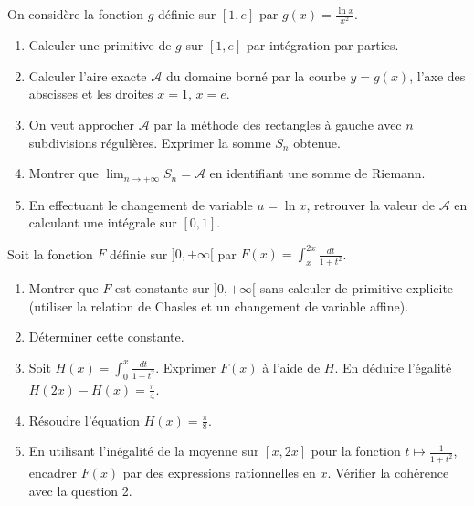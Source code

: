\documentclass[11pt]{article}
\begin{document}
\begin{exercice}
On considère la fonction $g$ définie sur $[1, e]$ par $g(x) = \frac{\ln x}{x^2}$.
\begin{enumerate}
    \item Calculer une primitive de $g$ sur $[1, e]$ par intégration par parties.
    \item Calculer l'aire exacte $\mathcal{A}$ du domaine borné par la courbe $y=g(x)$, l'axe des abscisses et les droites $x=1$, $x=e$.
    \item On veut approcher $\mathcal{A}$ par la méthode des rectangles à gauche avec $n$ subdivisions régulières. Exprimer la somme $S_n$ obtenue.
    \item Montrer que $\lim_{n \to +\infty} S_n = \mathcal{A}$ en identifiant une somme de Riemann.
    \item En effectuant le changement de variable $u = \ln x$, retrouver la valeur de $\mathcal{A}$ en calculant une intégrale sur $[0, 1]$.
\end{enumerate}
\end{exercice}

\begin{exercice}
Soit la fonction $F$ définie sur $]0, +\infty[$ par $F(x) = \int_x^{2x} \frac{dt}{1+t^2}$.
\begin{enumerate}
    \item Montrer que $F$ est constante sur $]0, +\infty[$ sans calculer de primitive explicite (utiliser la relation de Chasles et un changement de variable affine).
    \item Déterminer cette constante.
    \item Soit $H(x) = \int_0^x \frac{dt}{1+t^2}$. Exprimer $F(x)$ à l'aide de $H$. En déduire l'égalité $H(2x) - H(x) = \frac{\pi}{4}$.
    \item Résoudre l'équation $H(x) = \frac{\pi}{8}$.
    \item En utilisant l'inégalité de la moyenne sur $[x, 2x]$ pour la fonction $t \mapsto \frac{1}{1+t^2}$, encadrer $F(x)$ par des expressions rationnelles en $x$. Vérifier la cohérence avec la question 2.
\end{enumerate}
\end{exercice}
\end{document}
